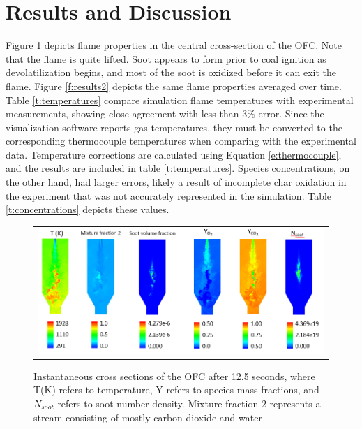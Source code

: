 \documentclass[12pt]{wssci}
\begin{document}
\section{Results and Discussion}
%
Figure \ref{f:results1} depicts flame properties in the central cross-section of the OFC.  
Note that the flame is quite lifted.  Soot appears to form prior to coal ignition as devolatilization begins, and most of the soot is oxidized before it can exit the flame.  Figure \ref{f:results2} depicts the same flame properties averaged over time.  Table \ref{t:temperatures} compare simulation flame temperatures with experimental measurements, showing close agreement with less than 3\% error.  Since the visualization software reports gas temperatures, they must be converted to the corresponding thermocouple temperatures when comparing with the experimental data.   Temperature corrections are calculated using Equation \ref{e:thermocouple}, and the results are included in table \ref{t:temperatures}.  Species concentrations, on the other hand, had larger errors, likely a result of incomplete char oxidation in the experiment that was not accurately represented in the simulation.  Table \ref{t:concentrations} depicts these values.  

\begin{figure}[!h]
\begin{center}
\begin{tabular}{c}
\includegraphics[width=6 in]{../figures/resultsB.png}
\end{tabular}
\caption{Instantaneous cross sections of the OFC after 12.5 seconds, where T(K) refers to temperature, Y refers to species mass fractions, and $N_{soot}$ refers to soot number density.  Mixture fraction 2 represents a stream consisting of mostly carbon dioxide and water }
\label{f:results1}
\end{center}
\end{figure}
\end{document}
